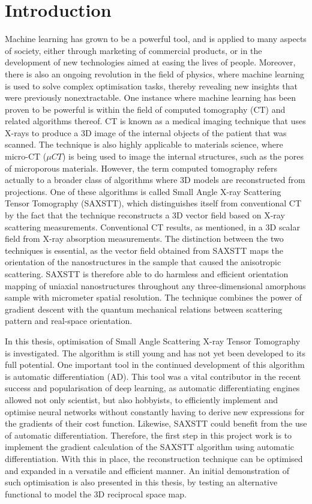 \chapter{Introduction}


Machine learning has grown to be a powerful tool, and is applied to many aspects of society,
either through marketing of commercial products, or in the development of new technologies aimed at easing the lives of people.
Moreover, there is also an ongoing revolution in the field of physics,
where machine learning is used to solve complex optimisation tasks, thereby revealing new insights that were previously nonextractable.
One instance where machine learning has been proven to be powerful is within the field of computed tomography (CT) and related algorithms thereof.
CT is known as a medical imaging technique that uses X-rays to produce a 3D image of the internal objects of the patient that was scanned.
The technique is also highly applicable to materials science, where micro-CT ($\mu CT$) is being used to image the internal structures, such as the pores of microporous materials.
However, the term computed tomography refers actually to a broader class of algorithms where 3D models are reconstructed from projections.
One of these algorithms is called Small Angle X-ray Scattering Tensor Tomography (SAXSTT), which distinguishes itself from conventional CT by the fact that the technique
reconstructs a 3D vector field based on X-ray scattering measurements. Conventional CT results, as mentioned, in a 3D scalar field from X-ray absorption measurements.
The distinction between the two techniques is essential, as the vector field obtained from SAXSTT maps the orientation of the nanostructures in the sample that caused the anisotropic scattering.
SAXSTT is therefore able to do harmless and efficient orientation mapping of uniaxial nanostructures throughout any three-dimensional amorphous sample with micrometer spatial resolution.
The technique combines the power of gradient descent with the quantum mechanical relations between scattering pattern and real-space orientation.

In this thesis, optimisation of Small Angle Scattering X-ray Tensor Tomography is investigated.
The algorithm is still young and has not yet been developed to its full potential.
One important tool in the continued development of this algorithm is automatic differentiation (AD).
This tool was a vital contributor in the recent success and popularisation of deep learning,
as automatic differentiating engines allowed not only scientist, but also hobbyists, to efficiently implement and optimise neural networks without constantly
having to derive new expressions for the gradients of their cost function. Likewise, SAXSTT could benefit from the use of automatic differentiation.
Therefore, the first step in this project work is to implement the gradient calculation of the SAXSTT algorithm using automatic differentiation.
With this in place, the reconstruction technique can be optimised and expanded in a versatile and efficient manner.
An initial demonstration of such optimisation is also presented in this thesis, by testing an alternative functional to model the 3D reciprocal space map.